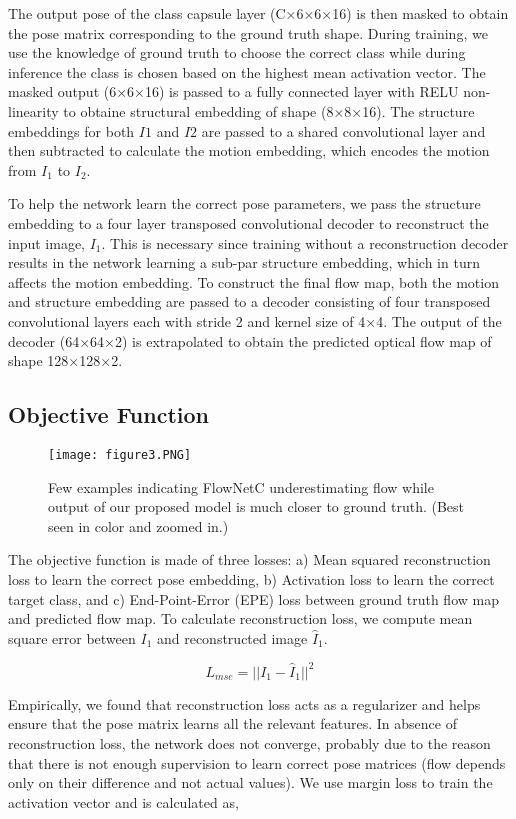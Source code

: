 \documentclass[11pt]{article}
\begin{document}
The output pose of the class capsule layer (C×6×6×16)
is then masked to obtain the pose matrix corresponding to
the ground truth shape. During training, we use the knowledge of ground truth to choose the correct class while during
inference the class is chosen based on the highest mean activation vector. The masked output (6×6×16) is passed to
a fully connected layer with RELU non-linearity to obtaine structural embedding of shape (8×8×16). The structure
embeddings for both \(I1\) and \(I2\) are passed to a shared convolutional layer and then subtracted to calculate the motion
embedding, which encodes the motion from \(I_{1}\) to \(I_{2}\).

To help the network learn the correct pose parameters,
we pass the structure embedding to a four layer transposed
convolutional decoder to reconstruct the input image, \(I_{1}\).
This is necessary since training without a reconstruction decoder results in the network learning a sub-par structure embedding, which in turn affects the motion embedding. To
construct the final flow map, both the motion and structure
embedding are passed to a decoder consisting of four transposed convolutional layers each with stride 2 and kernel
size of 4×4. The output of the decoder (64×64×2) is extrapolated to obtain the predicted optical flow map of shape
128×128×2.

\subsection{Objective Function}

\begin{figure}
\centering
\texttt{[image: figure3.PNG]}
\caption{Few examples indicating FlowNetC underestimating flow while output of our proposed model is much closer to ground truth. (Best seen in color and zoomed in.)}
\end{figure}

The objective function is made of three losses: a) Mean
squared reconstruction loss to learn the correct pose embedding, b) Activation loss to learn the correct target class, and
c) End-Point-Error (EPE) loss between ground truth flow
map and predicted flow map. To calculate reconstruction
loss, we compute mean square error between \(I_{1}\) and reconstructed image \(\hat I_{1}\).


    \[{L_{mse}} =  || I_{1} - {\hat I_{1}} ||^{2}\]


Empirically, we found that reconstruction loss acts as a regularizer and helps ensure that the pose matrix learns all the
relevant features. In absence of reconstruction loss, the network does not converge, probably due to the reason that
there is not enough supervision to learn correct pose matrices (flow depends only on their difference and not actual
values). We use margin loss to train the activation vector
and is calculated as,
\end{document}
